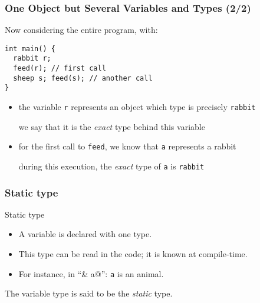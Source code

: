 \documentclass{beamer}
\newcommand{\code}[1]{{\scriptsize{\texttt{#1}}}\xspace}
\begin{document}
\begin{frame}[fragile]
  \frametitle{One Object but Several Variables and Types (2/2)}

Now considering the entire program, with:
\begin{lstlisting}
int main() {
  rabbit r;
  feed(r); // first call
  sheep s; feed(s); // another call
}
\end{lstlisting}

\begin{itemize}
\item the variable \code{r} represents an object which type is
  precisely \code{rabbit}
  \begin{center}
    we say that it is the \emph{exact} type behind this variable
  \end{center}
\item for the first call to \code{feed}, we know that \code{a} represents a rabbit
  \begin{center}
    during this execution, the \emph{exact} type of \code{a} is \code{rabbit}
  \end{center}
\end{itemize}

\end{frame}


\begin{frame}
  \frametitle{Static type}

  \begin{block}{Static type}
    \begin{itemize}
      \item A variable is declared with one type.
      \item This type can be read in the code; it is known at compile-time.
      \item For instance, in ``\lstinline@animal& a@'': \code{a} is an animal.
    \end{itemize}
    
    The variable type is said to be the \emph{static} type.
  \end{block}
  
\end{frame}
\end{document}
